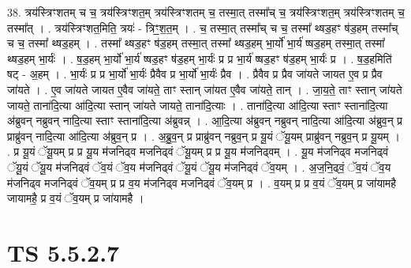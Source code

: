 \documentclass[17pt]{extarticle}
\begin{document}
38. त्रय॑स्त्रिꣳशतम् च च॒ त्रय॑स्त्रिꣳशत॒म् त्रय॑स्त्रिꣳशतम् च॒ तस्मा॒त् तस्मा᳚च् च॒ त्रय॑स्त्रिꣳशत॒म् त्रय॑स्त्रिꣳशतम् च॒ तस्मा᳚त् । . त्रय॑स्त्रिꣳशत॒मिति॒ त्रयः॑ - त्रिꣳ॒॒श॒त॒म् । . च॒ तस्मा॒त् तस्मा᳚च् च च॒ तस्मा᳚ थ्षड॒हꣳ ष॑ड॒हम् तस्मा᳚च् च च॒ तस्मा᳚ थ्षड॒हम् । . तस्मा᳚ थ्षड॒हꣳ ष॑ड॒हम् तस्मा॒त् तस्मा᳚ थ्षड॒हम् भा॒र्यो॑ भा॒र्य॑ ष्षड॒हम् तस्मा॒त् तस्मा᳚ थ्षड॒हम् भा॒र्यः॑ । . ष॒ड॒हम् भा॒र्यो॑ भा॒र्य॑ ष्षड॒हꣳ ष॑ड॒हम् भा॒र्यः॑ प्र प्र भा॒र्य॑ ष्षड॒हꣳ ष॑ड॒हम् भा॒र्यः॑ प्र । . ष॒ड॒हमिति॑ षट् - अ॒हम् । . भा॒र्यः॑ प्र प्र भा॒र्यो॑ भा॒र्यः॑ प्रैवैव प्र भा॒र्यो॑ भा॒र्यः॑ प्रैव । . प्रैवैव प्र प्रैव जा॑यते जायत ए॒व प्र प्रैव जा॑यते । . ए॒व जा॑यते जायत ए॒वैव जा॑यते॒ ताꣳ स्तान् जा॑यत ए॒वैव जा॑यते॒ तान् । . जा॒य॒ते॒ ताꣳ स्तान् जा॑यते जायते॒ ताना॑दि॒त्या आ॑दि॒त्या स्तान् जा॑यते जायते॒ ताना॑दि॒त्याः । . ताना॑दि॒त्या आ॑दि॒त्या स्ताꣳ स्ताना॑दि॒त्या अ॑ब्रुवन् नब्रुवन् नादि॒त्या स्ताꣳ स्ताना॑दि॒त्या अ॑ब्रुवन्न् । . आ॒दि॒त्या अ॑ब्रुवन् नब्रुवन् नादि॒त्या आ॑दि॒त्या अ॑ब्रुव॒न् प्र प्राब्रु॑वन् नादि॒त्या आ॑दि॒त्या अ॑ब्रुव॒न् प्र । . अ॒ब्रु॒व॒न् प्र प्राब्रु॑वन् नब्रुव॒न् प्र यू॒यं ॅयू॒यम् प्राब्रु॑वन् नब्रुव॒न् प्र यू॒यम् । . प्र यू॒यं ॅयू॒यम् प्र प्र यू॒य म॑जनिढ्व मजनिढ्वं ॅयू॒यम् प्र प्र यू॒य म॑जनिढ्वम् । . यू॒य म॑जनिढ्व मजनिढ्वं ॅयू॒यं ॅयू॒य म॑जनिढ्वं ॅव॒यं ॅव॒य म॑जनिढ्वं ॅयू॒यं ॅयू॒य म॑जनिढ्वं ॅव॒यम् । . अ॒ज॒नि॒ढ्वं॒ ॅव॒यं ॅव॒य म॑जनिढ्व मजनिढ्वं ॅव॒यम् प्र प्र व॒य म॑जनिढ्व मजनिढ्वं ॅव॒यम् प्र । . व॒यम् प्र प्र व॒यं ॅव॒यम् प्र जा॑यामहै जायामहै॒ प्र व॒यं ॅव॒यम् प्र जा॑यामहै । \newline
\pagebreak
{}

\section{ TS 5.5.2.7 }
\end{document}
